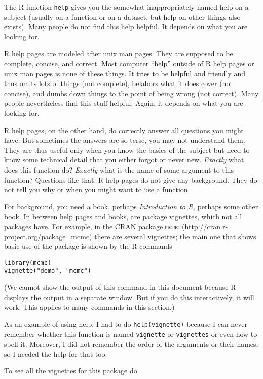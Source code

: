 \documentclass[
]{article}
\begin{document}
The R function \texttt{help} gives you the somewhat inappropriately
named help on a subject (usually on a function or on a dataset, but help
on other things also exists). Many people do not find this help helpful.
It depends on what you are looking for.

R help pages are modeled after unix man pages. They are supposed to be
complete, concise, and correct. Most computer ``help'' outside of R help
pages or unix man pages is none of these things. It tries to be helpful
and friendly and thus omits lots of things (not complete), belabors what
it does cover (not concise), and dumbs down things to the point of being
wrong (not correct). Many people nevertheless find this stuff helpful.
Again, it depends on what you are looking for.

R help pages, on the other hand, do correctly answer all questions you
might have. But sometimes the answers are so terse, you may not
understand them. They are thus useful only when you know the basics of
the subject but need to know some technical detail that you either
forgot or never new. \emph{Exactly} what does this function do?
\emph{Exactly} what is the name of some argument to this function?
Questions like that. R help pages do not give any background. They do
not tell you why or when you might want to use a function.

For background, you need a book, perhaps \emph{Introduction to R},
perhaps some other book. In between help pages and books, are package
vignettes, which not all packages have. For example, in the CRAN package
\texttt{mcmc} (\url{http://cran.r-project.org/package=mcmc}) there are
several vignettes; the main one that shows basic use of the package is
shown by the R commands

\begin{verbatim}
library(mcmc)
vignette("demo", "mcmc")
\end{verbatim}

(We cannot show the output of this command in this document because R
displays the output in a separate window. But if you do this
interactively, it will work. This applies to many commands in this
section.)

As an example of using help, I had to do \texttt{help(vignette)} because
I can never remember whether this function is named \texttt{vignette} or
\texttt{vignettes} or even how to spell it. Moreover, I did not remember
the order of the arguments or their names, so I needed the help for that
too.

To see all the vignettes for this package do
\end{document}
